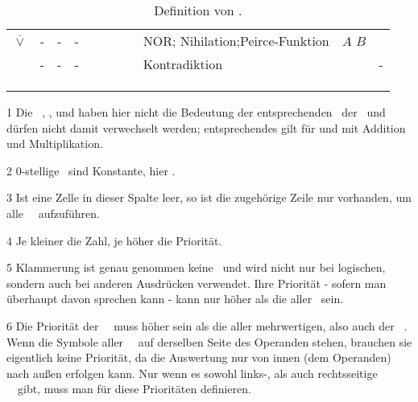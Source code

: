 {\begin{table}[p]
\begin{threeparttable}
\begin{tabularx}{\linewidth}{|c||c:cc:cccc|X:X|c|}
			 $\overline\lor$
			& - & - & - &\textfalse&\textfalse&\textfalse&\texttrue
			& NOR; Nihilation;\newline Peirce-Funktion
			&  $A$  $B$ & \thepnor \\
			\tableline%
			& - & - & - &\textfalse&\textfalse&\textfalse&\textfalse
			& Kontradiktion
			& & - \\
			\hline%
			\ifmarginparFlg\else
			 \\
			 \\
			\fi
			 \\
			\hline%
		\end{tabularx}
		\begin{tablenotes}
			\footnotesize
			\item[1] Die \Junktoren\ \chrqt{$\subset$}, \chrqt{$\supset$}, \chrqt{$\nsubset$} und  haben hier nicht die Bedeutung der entsprechenden \Operationen\ der \Mengenlehre\ und dürfen nicht damit verwechselt werden; entsprechendes gilt für \chrqt{$+$} und \chrqt{$\cdot$} mit Addition und Multiplikation.
			\item[2] 0-stellige \Junktoren\ sind Konstante, hier \emph{\Wahrheitswerte}.
			\item[3] Ist eine Zelle in dieser Spalte leer, so ist die zugehörige Zeile nur vorhanden, um alle \binaeren\ \Junktoren\ aufzuführen.
			\item[4] Je kleiner die Zahl, je höher die Priorität.
			\item[5] Klammerung ist genau genommen keine \Operation\ und wird nicht nur bei logischen, sondern auch bei anderen Ausdrücken verwendet. Ihre Priorität - sofern man überhaupt davon sprechen kann - kann nur höher als die aller \Junktoren\ sein.
			\item[6] Die Priorität der \unaeren\ \Operationen\ muss höher sein als die aller mehrwertigen, also auch der \binaeren\ \Operationen.
			Wenn die Symbole aller \unaeren\ \Operationen\ auf derselben Seite des Operanden stehen, brauchen sie eigentlich keine Priorität, da die Auswertung nur von innen (dem Operanden) nach außen erfolgen kann.
			Nur wenn es sowohl links-, als auch rechtsseitige \unaere\ \Operationen\ gibt, muss man für diese Prioritäten definieren.
		\end{tablenotes}
	\end{threeparttable}
	\caption{Definition von \aussagenlogischenSymbolen.}
	\label{tab:Symbole}%
\end{table}
\ifmarginparFlg\alleMoeglichenJunktoren\else\fi

}
